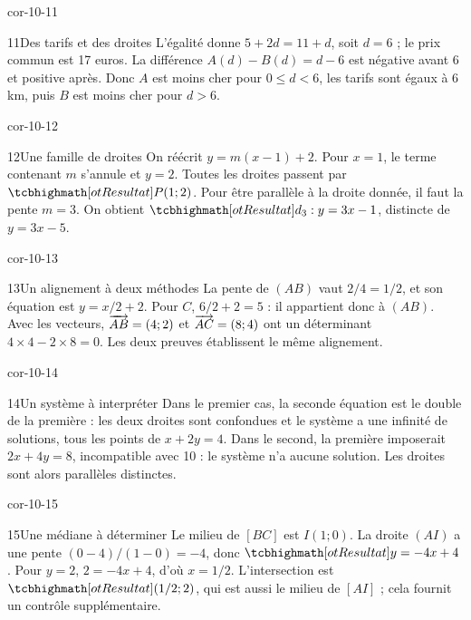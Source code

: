 \begin{blocLivre}{cor-10-11}
\begin{corrige}{11}{Des tarifs et des droites}
L’égalité donne $5+2d=11+d$, soit $d=6$ ; le prix commun est 17 euros. La différence $A(d)-B(d)=d-6$ est négative avant 6 et positive après. Donc $A$ est moins cher pour $0\le d<6$, les tarifs sont égaux à 6 km, puis $B$ est moins cher pour $d>6$.
\label{fig-cor-10-11}
\end{corrige}
\end{blocLivre}
\begin{blocLivre}{cor-10-12}
\begin{corrige}{12}{Une famille de droites}
On réécrit $y=m(x-1)+2$. Pour $x=1$, le terme contenant $m$ s’annule et $y=2$. Toutes les droites passent par $\res{P(1;2)}$. Pour être parallèle à la droite donnée, il faut la pente $m=3$. On obtient $\res{d_3:y=3x-1}$, distincte de $y=3x-5$.
\label{fig-cor-10-12}
\end{corrige}
\end{blocLivre}
\begin{blocLivre}{cor-10-13}
\begin{corrige}{13}{Un alignement à deux méthodes}
La pente de $(AB)$ vaut $2/4=1/2$, et son équation est $y=x/2+2$. Pour $C$, $6/2+2=5$ : il appartient donc à $(AB)$. Avec les vecteurs, $\overrightarrow{AB}=(4;2)$ et $\overrightarrow{AC}=(8;4)$ ont un déterminant $4\times4-2\times8=0$. Les deux preuves établissent le même alignement.
\label{fig-cor-10-13}
\end{corrige}
\end{blocLivre}
\begin{blocLivre}{cor-10-14}
\begin{corrige}{14}{Un système à interpréter}
Dans le premier cas, la seconde équation est le double de la première : les deux droites sont confondues et le système a une infinité de solutions, tous les points de $x+2y=4$. Dans le second, la première imposerait $2x+4y=8$, incompatible avec 10 : le système n’a aucune solution. Les droites sont alors parallèles distinctes.
\label{fig-cor-10-14}
\end{corrige}
\end{blocLivre}
\begin{blocLivre}{cor-10-15}
\begin{corrige}{15}{Une médiane à déterminer}
Le milieu de $[BC]$ est $I(1;0)$. La droite $(AI)$ a une pente $(0-4)/(1-0)=-4$, donc $\res{y=-4x+4}$. Pour $y=2$, $2=-4x+4$, d’où $x=1/2$. L’intersection est $\res{(1/2;2)}$, qui est aussi le milieu de $[AI]$ ; cela fournit un contrôle supplémentaire.
\label{fig-cor-10-15}
\end{corrige}
\end{blocLivre}
